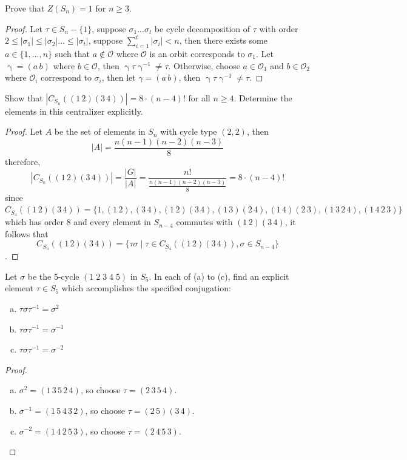 \documentclass{article}
\newcommand{\orbit}{\mathcal{O}}
\newenvironment{problem}[2][Problem]{\begin{trivlist}
\item[\hskip \labelsep {\bfseries #1}\hskip \labelsep {\bfseries #2.}]}{\end{trivlist}}
\begin{document}
\begin{problem}{8}
    Prove that $Z(S_n)=1$ for $n \geq 3$.
\end{problem}
\begin{proof}


    Let $\tau \in S_n-\{1\}$, suppose $\sigma_1... \sigma_t$ be cycle decomposition of $\tau$ with order $2\leq |\sigma_1|\leq |\sigma_2|...\leq |\sigma_t|$, suppose $\sum_{i=1}^t|\sigma_i|<n$, then there exists some $a\in \{1, ..., n\}$ such that $a\notin \orbit$ where $\orbit$ is an orbit corresponds to $\sigma_1$. Let $\upgamma
=(a\, b)$ where $b \in \orbit$, then $\upgamma \tau \upgamma^{-1}\neq \tau$. Otherwise, choose $a \in \orbit_1$ and $b \in \orbit_2$ where $\orbit_i$ correspond to $\sigma_i$, then let $\gamma =(a \, b)$, then $\upgamma \tau \upgamma^{-1}\neq \tau$.
\end{proof}
\begin{problem}{9}
Show that \( |C_{S_n}((1 \, 2)(3 \, 4))| = 8 \cdot (n - 4)! \) for all \( n \geq 4 \). Determine the elements in this centralizer explicitly.
\end{problem}
\begin{proof}
    Let $A$ be the set of elements in $S_n$ with cycle type $(2, 2)$, then
\[     |A|=\frac{n(n-1)(n-2)(n-3)}{8}     \] therefore, \[         |C_{S_n}((1\, 2)(3 \, 4))|=\frac{|G|}{|A|}=\frac{n!}{\frac{n(n-1)(n-2)(n-3)}{8}} = 8 \cdot (n-4)!       \] since $C_{S_4}((1\, 2)(3\, 4))=\{1, (1\, 2), (3\, 4), (1\, 2)(3\, 4), (1\, 3)(2\, 4), (1\, 4)(2\, 3), (1\, 3\, 2 \, 4), (1\, 4\, 2\, 3)\}$ which has order $8$ and every element in $S_{n-4}$ commutes with $(1\, 2)(3\, 4)$, it follows that
\[
C_{S_n}((1\, 2)(3 \, 4))=\{\tau \sigma \mid \tau \in C_{S_4}((1\, 2)(3\, 4)), \sigma \in S_{n-4}\}
\].
\end{proof}
\begin{problem}{10}
    Let \( \sigma \) be the 5-cycle \( (1 \; 2 \; 3 \; 4 \; 5) \) in \( S_5 \). In each of (a) to (c), find an explicit element \( \tau \in S_5 \) which accomplishes the specified conjugation:
    \begin{enumerate}[(a)]
        \item \( \tau \sigma \tau^{-1} = \sigma^2 \)
        \item \( \tau \sigma \tau^{-1} = \sigma^{-1} \)
        \item \( \tau \sigma \tau^{-1} = \sigma^{-2} \)
    \end{enumerate}
\end{problem}
\begin{proof}
    \begin{enumerate}[(a)]
        \item $\sigma^2=(1\, 3\, 5\, 2\, 4)$, so choose $\tau = (2\, 3\, 5\, 4)$.
        \item $\sigma^{-1}=(1\, 5\, 4\, 3\, 2)$, so choose $\tau = (2\, 5)(3\, 4)$.
        \item $\sigma^{-2}=(1\, 4\, 2\, 5\, 3)$, so choose $\tau = (2 \, 4\, 5\, 3)$.
    \end{enumerate}
\end{proof}
\end{document}
